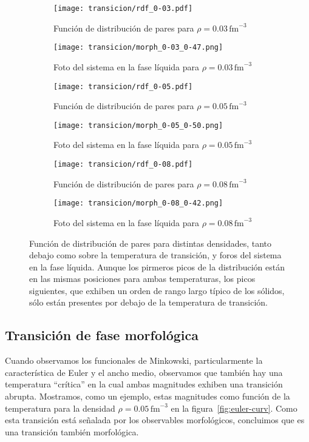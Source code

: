 \begin{figure*}[floatfix]
  \centering
  \begin{subfigure}[h!]{0.4\columnwidth}
    \texttt{[image: transicion/rdf\_0-03.pdf]}
    \caption{Función de distribución de pares para $\rho=0.03\,\text{fm}^{-3}$}
  \end{subfigure}
  \begin{subfigure}[h!]{0.3\columnwidth}
    \texttt{[image: transicion/morph\_0-03\_0-47.png]}
    \caption{Foto del sistema en la fase líquida para $\rho=0.03\,\text{fm}^{-3}$}
  \end{subfigure}
  \begin{subfigure}[h!]{0.4\columnwidth}
    \texttt{[image: transicion/rdf\_0-05.pdf]}
    \caption{Función de distribución de pares para $\rho=0.05\,\text{fm}^{-3}$}
  \end{subfigure}
  \begin{subfigure}[h!]{0.3\columnwidth}
    \texttt{[image: transicion/morph\_0-05\_0-50.png]}
    \caption{Foto del sistema en la fase líquida para $\rho=0.05\,\text{fm}^{-3}$}
  \end{subfigure}
  \begin{subfigure}[h!]{0.4\columnwidth}
    \texttt{[image: transicion/rdf\_0-08.pdf]}
    \caption{Función de distribución de pares para $\rho=0.08\,\text{fm}^{-3}$}
  \end{subfigure}
  \begin{subfigure}[h!]{0.3\columnwidth}
    \texttt{[image: transicion/morph\_0-08\_0-42.png]}
    \caption{Foto del sistema en la fase líquida para $\rho=0.08\,\text{fm}^{-3}$}
  \end{subfigure}
  \caption{Función de distribución de pares para distintas densidades, tanto debajo como sobre la temperatura de transición, y foros del sistema en la fase líquida.
Aunque los pirmeros picos de la distribución están en las mismas posiciones para ambas temperaturas, los picos siguientes, que exhiben un orden de rango largo típico de los sólidos, sólo están presentes por debajo de la temperatura de transición.}
  \label{fig:rdf}
\end{figure*}

\subsection{Transición de fase morfológica}
Cuando observamos los funcionales de Minkowski, particularmente la característica de Euler y el ancho medio, observamos que también hay una temperatura ``crítica'' en la cual ambas magnitudes exhiben una transición abrupta.
Mostramos, como un ejemplo, estas magnitudes como función de la temperatura para la densidad
$\rho=0.05\,\text{fm}^{-3}$ en la figura~\ref{fig:euler-curv}.
Como esta transición está señalada por los observables morfológicos, concluimos que es una transición también morfológica.


